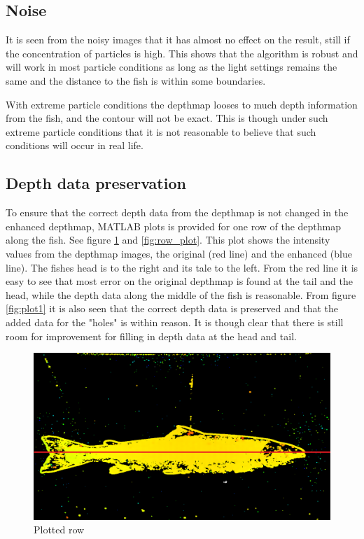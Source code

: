 \subsection{Noise}

It is seen from the noisy images that it has almost no effect on the result, still if the concentration of particles is high. This shows that the algorithm is robust and will work in most particle conditions as long as the light settings remains the same and the distance to the fish is within some boundaries.

With extreme particle conditions the depthmap looses to much depth information from the fish, and the contour will not be exact. This is though under such extreme particle conditions that it is not reasonable to believe that such conditions will occur in real life.


\subsection{Depth data preservation}

To ensure that the correct depth data from the depthmap is not changed in the enhanced depthmap, MATLAB plots is provided for one row of the depthmap along the fish. See figure \ref{fig:sectional} and \ref{fig:row_plot}. This plot shows the intensity values from the depthmap images, the original (red line) and the enhanced (blue line). The fishes head is to the right and its tale to the left. From the red line it is easy to see that most error on the original depthmap is found at the tail and the head, while the depth data along the middle of the fish is reasonable. From figure \ref{fig:plot1} it is also seen that the correct depth data is preserved and that the added data for the "holes" is within reason. It is though clear that there is still room for improvement for filling in depth data at the head and tail. 

\begin{figure}[h]
    \centering
    \includegraphics[width=.7\linewidth]{images/results/sectional}
    \caption{Plotted row}
    \label{fig:sectional}
\end{figure}



